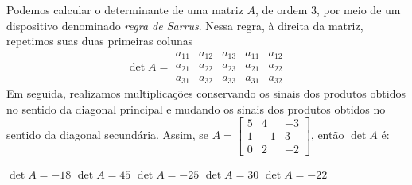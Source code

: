 Podemos calcular o determinante de uma matriz $A$, de ordem $3$, por meio de um dispositivo denominado {\it regra de Sarrus}. Nessa regra, à direita da matriz, repetimos suas duas primeiras colunas
\[\det A = \begin{array}{|ccc|cc}
a_{11} &  a_{12}  &  a_{13}  &  a_{11}  &  a_{12}\\
a_{21} &  a_{22}  &  a_{23}  &  a_{21}  &  a_{22}\\
a_{31} &  a_{32}  &  a_{33}  &  a_{31}  &  a_{32}
\end{array} \]
Em seguida, realizamos multiplicações conservando os sinais dos produtos obtidos no sentido da diagonal principal e mudando os sinais dos produtos obtidos no sentido da diagonal secundária. Assim,
se $A = \left[ \begin{array}{ccc}
     5   &  4 &   -3\\
     1  &  -1  &   3\\
     0   &  2   & -2
\end{array} \right]$, então $\det A$ é:

$\det A = -18$
$\det A = 45$
$\det A = -25$
$\det A = 30$
$\det A = -22$




